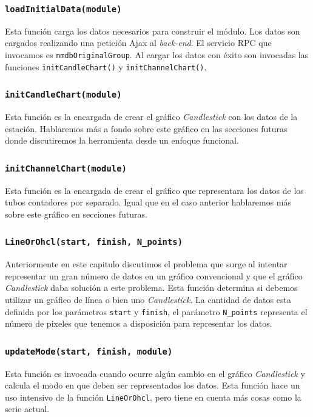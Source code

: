 		\subsubsection{\texttt{loadInitialData(module)}}
			Esta función carga los datos necesarios para construir el módulo. Los datos son cargados realizando una petición Ajax al
			\emph{back-end}. El servicio RPC que invocamos es \texttt{nmdbOriginalGroup}. Al cargar los datos con éxito son invocadas las
			funciones \texttt{initCandleChart()} y \texttt{initChannelChart()}. 
		\subsubsection{\texttt{initCandleChart(module)}}
			Esta función es la encargada de crear el gráfico \emph{Candlestick} con los datos de la estación. Hablaremos más a fondo sobre
			este gráfico en las secciones futuras donde discutiremos la herramienta desde un enfoque funcional.
		\subsubsection{\texttt{initChannelChart(module)}}
			Esta función es la encargada de crear el gráfico que representara los datos de los tubos contadores por separado. Igual que en
			el caso anterior hablaremos más sobre este gráfico en secciones futuras.
		\subsubsection{\texttt{LineOrOhcl(start, finish, N\_points)}}
			Anteriormente en este capitulo discutimos el problema que surge al intentar representar un gran número de datos en un gráfico
			convencional y que el gráfico \emph{Candlestick} daba solución a este problema. Esta función determina si debemos utilizar un
			gráfico de línea o bien uno \emph{Candlestick}. La cantidad de datos esta definida por los parámetros \texttt{start} y
			\texttt{finish}, el parámetro \texttt{N\_points} representa el número de pixeles que tenemos a disposición para representar
			los datos.
		\subsubsection{\texttt{updateMode(start, finish, module)}}
			Esta función es invocada cuando ocurre algún cambio en el gráfico \emph{Candlestick} y calcula el modo en que deben ser
			representados los datos. Esta función hace un uso intensivo de la función \texttt{LineOrOhcl}, pero tiene en cuenta más cosas
			como la serie actual.

